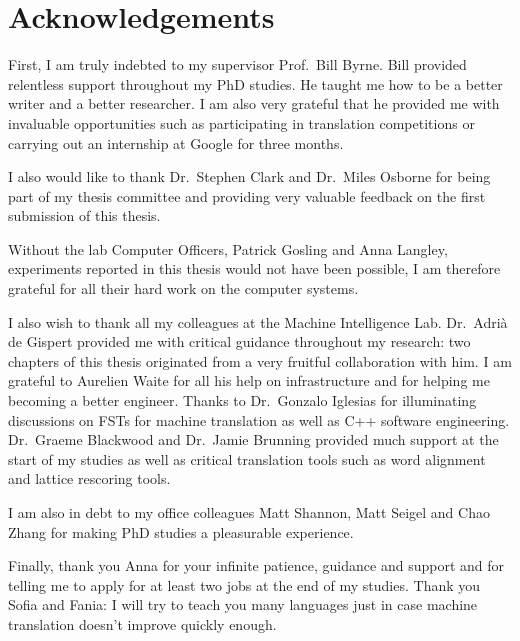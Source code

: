 \chapter*{Acknowledgements}

First, I am truly indebted to my supervisor
Prof.\ Bill Byrne.
Bill provided relentless support throughout
my PhD studies.
He taught me how to be a better writer and a better researcher.
I am also very grateful that he provided me with
invaluable opportunities such as participating
in translation competitions or carrying out an internship
at Google for three months.

I also would like to thank Dr.\ Stephen Clark and Dr.\ Miles
Osborne for being part of my thesis committee and providing
very valuable feedback on the first submission of this thesis.

Without the lab Computer Officers, Patrick Gosling
and Anna Langley, experiments reported in this thesis
would not have been possible, I am therefore
grateful for all their hard work on the computer
systems.

I also wish to thank all my colleagues at
the Machine Intelligence Lab.
Dr.\ Adrià de Gispert provided me with
critical guidance throughout my research: two chapters
of this thesis originated from a very fruitful collaboration
with him.
I am grateful to Aurelien Waite for all his
help on infrastructure and for helping me becoming
a better engineer.
Thanks to Dr.\ Gonzalo Iglesias for illuminating
discussions on FSTs for machine translation as well
as C++ software engineering.
Dr.\ Graeme Blackwood and Dr.\ Jamie Brunning
provided much support at the start of my studies as
well as critical translation tools such as word alignment
and lattice rescoring tools.

I am also in debt to my office colleagues Matt Shannon, Matt Seigel
and Chao Zhang for making PhD studies a pleasurable experience.

Finally, thank you Anna for your infinite patience, guidance and
support and for telling me to apply for at least two jobs at
the end of my studies. Thank you Sofia and Fania: I will
try to teach you many languages just in case machine translation
doesn't improve quickly enough.
